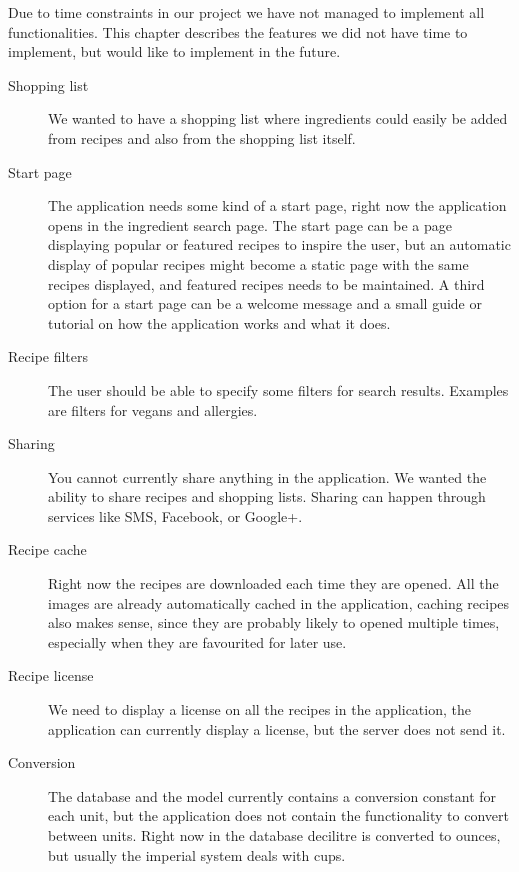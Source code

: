 Due to time constraints in our project we have not managed to implement all functionalities. This chapter describes the features we did not have time to implement, but would like to implement in the future.

\begin{description}
\item[Shopping list] We wanted to have a shopping list where ingredients could easily be added from recipes and also from the shopping list itself.

\item[Start page] The application needs some kind of a start page, right now the application opens in the ingredient search page. The start page can be a page displaying popular or featured recipes to inspire the user, but an automatic display of popular recipes might become a static page with the same recipes displayed, and featured recipes needs to be maintained. A third option for a start page can be a welcome message and a small guide or tutorial on how the application works and what it does.

\item[Recipe filters] The user should be able to specify some filters for search results. Examples are filters for vegans and allergies.

\item[Sharing] You cannot currently share anything in the application. We wanted the ability to share recipes and shopping lists. Sharing can happen through services like SMS, Facebook, or Google+.

\item[Recipe cache] Right now the recipes are downloaded each time they are opened. All the images are already automatically cached in the application, caching recipes also makes sense, since they are probably likely to opened multiple times, especially when they are favourited for later use.

\item[Recipe license] We need to display a license on all the recipes in the application, the application can currently display a license, but the server does not send it.

\item[Conversion] The database and the model currently contains a conversion constant for each unit, but the application does not contain the functionality to convert between units. Right now in the database decilitre is converted to ounces, but usually the imperial system deals with cups.


\end{description}
